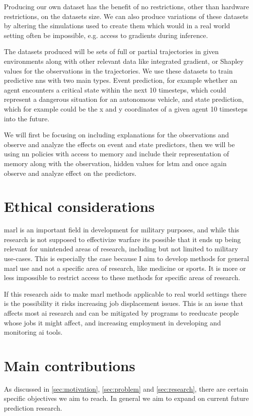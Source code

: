 \documentclass[UKenglish]{uiomasterthesis}
\begin{document}
Producing our own dataset has the benefit of no restrictions, other than hardware restrictions, on the datasets size. We can also produce variations of these datasets by altering the simulations used to create them which would in a real world setting often be impossible, e.g. access to gradients during inference.

The datasets produced will be sets of full or partial trajectories in given environments along with other relevant data like integrated gradient, or Shapley values for the observations in the trajectories. We use these datasets to train predictive \acp{nn} with two main types. Event prediction, for example whether an agent encounters a critical state within the next 10 timesteps, which could represent a dangerous situation for an autonomous vehicle, and state prediction, which for example could be the x and y coordinates of a given agent 10 timesteps into the future.

We will first be focusing on including explanations for the observations and observe and analyze the effects on event and state predictors, then we will be using \ac{nn} policies with access to memory and include their representation of memory along with the observation, hidden values for lstm and once again observe and analyze effect on the predictors.

\section{Ethical considerations}
\ac{marl} is an important field in development for military purposes\cite{military_marl}, and while this research is not supposed to effectivize warfare its possible that it ends up being relevant for unintended areas of research, including but not limited to military use-cases. This is especially the case because I aim to develop methods for general \ac{marl} use and not a specific area of research, like medicine or sports. It is more or less impossible to restrict access to these methods for specific areas of research.

If this research aids to make \ac{marl} methods applicable to real world settings there is the possibility it risks increasing job displacement issues. This is an issue that affects most \ac{ai} research and can be mitigated by programs to reeducate people whose jobs it might affect, and increasing employment in developing and monitoring \ac{ai} tools.


\section{Main contributions}
As discussed in \cref{sec:motivation}, \cref{sec:problem} and \cref{sec:research}, there are certain specific objectives we aim to reach. In general we aim to expand on current future prediction research.
\end{document}

